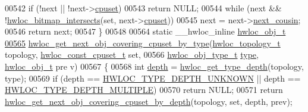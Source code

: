 \begin{DoxyCode}
00542   \textcolor{keywordflow}{if} (!next || !next->\hyperlink{a00016_a67925e0f2c47f50408fbdb9bddd0790f}{cpuset})
00543     \textcolor{keywordflow}{return} NULL;
00544   \textcolor{keywordflow}{while} (next && !\hyperlink{a00065_ga575c27953709a8cb9a047aae65157526}{hwloc_bitmap_intersects}(\textcolor{keyword}{set}, next->\hyperlink{a00016_a67925e0f2c47f50408fbdb9bddd0790f}{cpuset}))
00545     next = next->\hyperlink{a00016_a85a788017457129589318b6c39451acf}{next_cousin};
00546   \textcolor{keywordflow}{return} next;
00547 \}
00548 
00564 \textcolor{keyword}{static} \_\_hwloc\_inline \hyperlink{a00016}{hwloc_obj_t}
\hypertarget{a00031_source_l00565}{}\hyperlink{a00056_ga5915ea30f326676b3a4cfff371ce04d1}{00565} \hyperlink{a00056_ga5915ea30f326676b3a4cfff371ce04d1}{hwloc_get_next_obj_covering_cpuset_by_type}(\hyperlink{a00039_ga9d1e76ee15a7dee158b786c30b6a6e38}{hwloc_topology_t} topology, 
      \hyperlink{a00040_ga1f784433e9b606261f62d1134f6a3b25}{hwloc_const_cpuset_t} \textcolor{keyword}{set},
00566                                            \hyperlink{a00041_gacd37bb612667dc437d66bfb175a8dc55}{hwloc_obj_type_t} \hyperlink{a00016_acc4f0803f244867e68fe0036800be5de}{type}, \hyperlink{a00016}{hwloc_obj_t} pre
      v)
00567 \{
00568   \textcolor{keywordtype}{int} \hyperlink{a00016_a9d82690370275d42d652eccdea5d3ee5}{depth} = \hyperlink{a00046_gaea7c64dd59467f5201ba87712710b14d}{hwloc_get_type_depth}(topology, type);
00569   \textcolor{keywordflow}{if} (depth == \hyperlink{a00046_ggaf4e663cf42bbe20756b849c6293ef575a0565ab92ab72cb0cec91e23003294aad}{HWLOC_TYPE_DEPTH_UNKNOWN} || depth == \hyperlink{a00046_ggaf4e663cf42bbe20756b849c6293ef575ae99465995cacde6c210d5fc2e409798c}{HWLOC_TYPE_DEPTH_MULTIPLE})
00570     \textcolor{keywordflow}{return} NULL;
00571   \textcolor{keywordflow}{return} \hyperlink{a00056_ga2f9a4ec15e9cfae8c21501257a51ce5b}{hwloc_get_next_obj_covering_cpuset_by_depth}(topology, \textcolor{keyword}{set}, depth, prev);
      

\end{DoxyCode}
